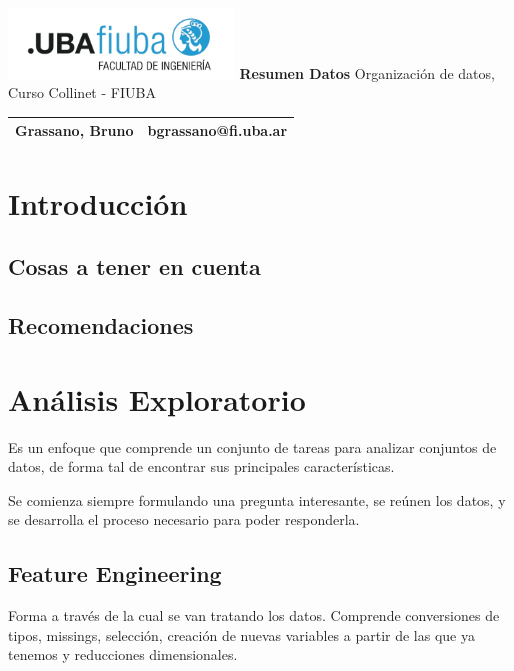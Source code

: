 \documentclass[titlepage,a4paper]{article}
\begin{document}
\begin{titlepage} %
	\hfill\includegraphics[width=6cm]{imagenesResumen/logofiuba.jpg}
    \centering
    \vfill
    \Huge \textbf{Resumen Datos}
    \vskip2cm
    \Large Organización de datos, Curso Collinet - FIUBA\\
    \vfill
    \begin{tabular}{ | l | l | }
      \hline
       Grassano, Bruno &  bgrassano@fi.uba.ar \\ \hline
  	\end{tabular}
    \vfill
    \vfill
\end{titlepage}

\tableofcontents %
\newpage

\section{Introducción}\label{sec:intro}


\subsection{Cosas a tener en cuenta}


\subsection{Recomendaciones}


\section{Análisis Exploratorio}
Es un enfoque que comprende un conjunto de tareas para analizar conjuntos de datos, de forma tal de encontrar sus principales características.

Se comienza siempre formulando una pregunta interesante, se reúnen los datos, y se desarrolla el proceso necesario para poder responderla.

\subsection{Feature Engineering}
Forma a través de la cual se van tratando los datos. Comprende conversiones de tipos, missings, selección, creación de nuevas variables a partir de las que ya tenemos y reducciones dimensionales.
\end{document}
